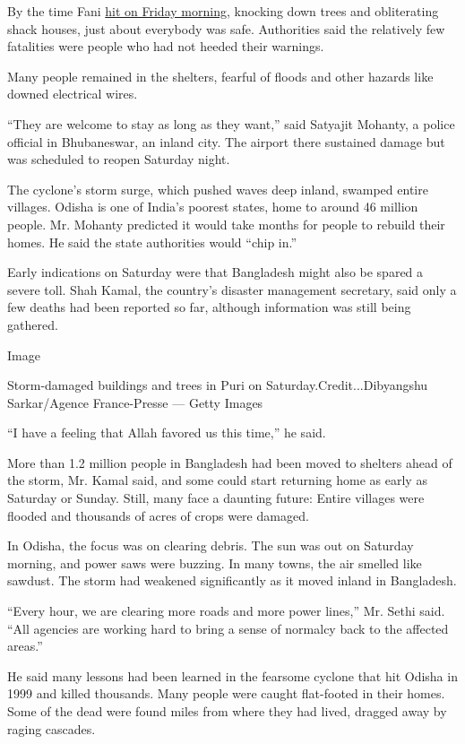 By the time Fani
\href{https://www.nytimes.com/2019/05/02/world/asia/india-cyclone-fani.html}{hit
on Friday morning}, knocking down trees and obliterating shack houses,
just about everybody was safe. Authorities said the relatively few
fatalities were people who had not heeded their warnings.

Many people remained in the shelters, fearful of floods and other
hazards like downed electrical wires.

``They are welcome to stay as long as they want,'' said Satyajit
Mohanty, a police official in Bhubaneswar, an inland city. The airport
there sustained damage but was scheduled to reopen Saturday night.

The cyclone's storm surge, which pushed waves deep inland, swamped
entire villages. Odisha is one of India's poorest states, home to around
46 million people. Mr. Mohanty predicted it would take months for people
to rebuild their homes. He said the state authorities would ``chip in.''

Early indications on Saturday were that Bangladesh might also be spared
a severe toll. Shah Kamal, the country's disaster management secretary,
said only a few deaths had been reported so far, although information
was still being gathered.

Image

Storm-damaged buildings and trees in Puri on
Saturday.Credit...Dibyangshu Sarkar/Agence France-Presse --- Getty
Images

``I have a feeling that Allah favored us this time,'' he said.

More than 1.2 million people in Bangladesh had been moved to shelters
ahead of the storm, Mr. Kamal said, and some could start returning home
as early as Saturday or Sunday. Still, many face a daunting future:
Entire villages were flooded and thousands of acres of crops were
damaged.

In Odisha, the focus was on clearing debris. The sun was out on Saturday
morning, and power saws were buzzing. In many towns, the air smelled
like sawdust. The storm had weakened significantly as it moved inland in
Bangladesh.

``Every hour, we are clearing more roads and more power lines,'' Mr.
Sethi said. ``All agencies are working hard to bring a sense of normalcy
back to the affected areas.''

He said many lessons had been learned in the fearsome cyclone that hit
Odisha in 1999 and killed thousands. Many people were caught flat-footed
in their homes. Some of the dead were found miles from where they had
lived, dragged away by raging cascades.

